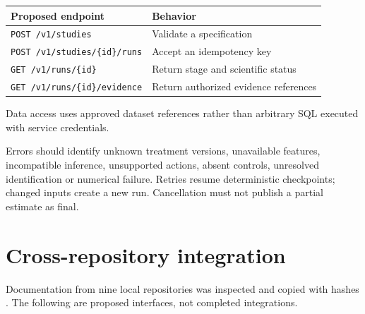\begin{center}\small
\begin{tabular}{P{76mm}P{68mm}}
\toprule Proposed endpoint & Behavior\\\midrule
\texttt{POST /v1/studies} & Validate a specification\\
\texttt{POST /v1/studies/\{id\}/runs} & Accept an idempotency key\\
\texttt{GET /v1/runs/\{id\}} & Return stage and scientific status\\
\texttt{GET /v1/runs/\{id\}/evidence} & Return authorized evidence references\\
\bottomrule
\end{tabular}
\end{center}
Data access uses approved dataset references rather than arbitrary SQL
executed with service credentials.

Errors should identify unknown treatment versions, unavailable features,
incompatible inference, unsupported actions, absent controls, unresolved
identification or numerical failure. Retries resume deterministic
checkpoints; changed inputs create a new run. Cancellation must not
publish a partial estimate as final.

\section{Cross-repository integration}
Documentation from nine local repositories was inspected and copied with
hashes \citep{localrepos}. The following are proposed interfaces,
not completed integrations.

